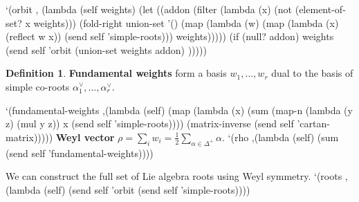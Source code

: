 \documentclass[a4paper,10pt]{article}%
\theoremstyle{definition} \newtheorem{Def}{Definition}
\begin{document}
`(orbit ,
  (lambda (self weights)
    (let ((addon 
           (filter (lambda (x) (not (element-of-set? x weights)))
                   (fold-right union-set '() 
                               (map (lambda (w)
                                      (map
                                       (lambda (x) (reflect w x))
                                       (send self 'simple-roots)))
                                    weights)))))
      (if (null? addon)
          weights
          (send self 'orbit (union-set weights addon) )))))
\nwendcode{}\nwdocspar
\begin{Def}
  {\bf Fundamental weights} form a basis $w_1,\dots,w_r$ dual to the basis of simple co-roots $\alpha_1^{\vee},\dots,\alpha_r^{\vee}$.
\end{Def}
\nwenddocs{}\plusendmoddef\nwstartdeflinemarkup{}\nwenddeflinemarkup
`(fundamental-weights
  ,(lambda (self)
     (map (lambda (x)
            (sum (map-n (lambda (y z) (mul y z)) x (send self 'simple-roots))))
          (matrix-inverse (send self 'cartan-matrix)))))
\nwendcode{}\nwdocspar
{\bf Weyl vector} $\rho=\sum_i w_i=\frac{1}{2}\sum_{\alpha\in \Delta^{+}}\alpha$.
\nwenddocs{}\plusendmoddef\nwstartdeflinemarkup{}\nwenddeflinemarkup
`(rho ,(lambda (self)
         (sum (send self 'fundamental-weights))))

\nwendcode{}\nwdocspar
We can construct the full set of Lie algebra roots using Weyl symmetry.
\nwenddocs{}\plusendmoddef\nwstartdeflinemarkup{}\nwenddeflinemarkup
`(roots ,(lambda (self)
           (send self 'orbit (send self 'simple-roots))))
\nwendcode{}\nwdocspar
\end{document}

